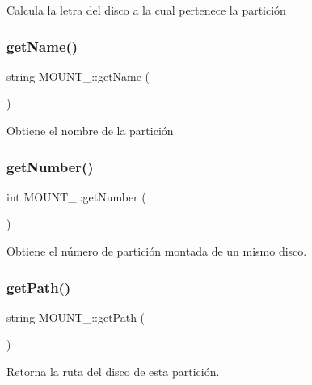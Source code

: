 Calcula la letra del disco a la cual pertenece la partición \mbox{\label{classMOUNT___aa22dd1507def0dd79278528eb364ff2e}} 
\subsubsection{\texorpdfstring{get\+Name()}{getName()}}
{\footnotesize\ttfamily string M\+O\+U\+N\+T\+\_\+\+::get\+Name (\begin{DoxyParamCaption}{ }\end{DoxyParamCaption})\hspace{0.3cm}{\ttfamily [inline]}}

Obtiene el nombre de la partición \mbox{\label{classMOUNT___a737ec85f4dd23d389d85b9dee48d18ce}} 
\subsubsection{\texorpdfstring{get\+Number()}{getNumber()}}
{\footnotesize\ttfamily int M\+O\+U\+N\+T\+\_\+\+::get\+Number (\begin{DoxyParamCaption}{ }\end{DoxyParamCaption})}

Obtiene el número de partición montada de un mismo disco. \mbox{\label{classMOUNT___a3fa81be2f40ddf3f043c8f459cbaa3e6}} 
\subsubsection{\texorpdfstring{get\+Path()}{getPath()}}
{\footnotesize\ttfamily string M\+O\+U\+N\+T\+\_\+\+::get\+Path (\begin{DoxyParamCaption}{ }\end{DoxyParamCaption})\hspace{0.3cm}{\ttfamily [inline]}}

Retorna la ruta del disco de esta partición. \mbox{\label{classMOUNT___a709e81cf0e777d2dfa9c24ca30a3c778}} 
